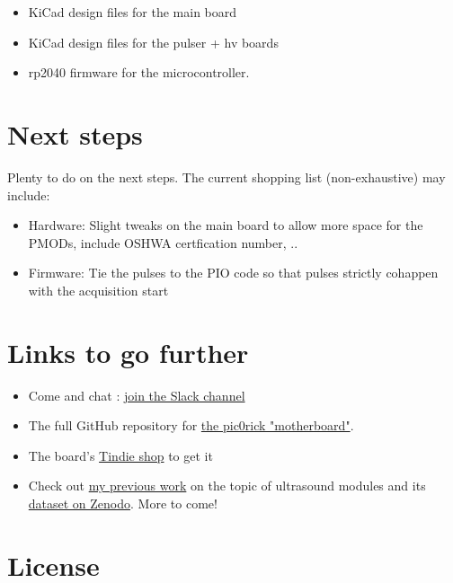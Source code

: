 \documentclass{article}
\begin{document}
\begin{itemize}
    \item KiCad design files for the main board
    \item KiCad design files for the pulser + hv boards
    \item rp2040 firmware for the microcontroller.
\end{itemize}





 \section{Next steps}

Plenty to do on the next steps. The current shopping list (non-exhaustive) may include:


\begin{itemize}
    \item Hardware: Slight tweaks on the main board to allow more space for the PMODs, include OSHWA certfication number, ..
   \item Firmware: Tie the pulses to the PIO code so that pulses strictly cohappen with the acquisition start 
\end{itemize}


\section{Links to go further}

\begin{itemize}
\item Come and chat : \href{https://join.slack.com/usdevkit/shared_invite/MTkxODU5MjU0NjI1LTE0OTY1ODgxMDEtMmYyZTliZDBlZA}{join the Slack channel} 
\item The full GitHub repository for \href{https://github.com/kelu124/pic0rick}{the pic0rick "motherboard"}.
\item The board’s \href{https://www.tindie.com/stores/kelu124/}{Tindie shop} to get it
\item Check out \href{http://doi.org/10.5334/joh.28}{my previous work} on the topic of ultrasound modules \cite{review} and its \href{http://doi.org/10.5281/zenodo.377054}{dataset on Zenodo}. More to come!
\end{itemize}

\section*{License}
\end{document}
